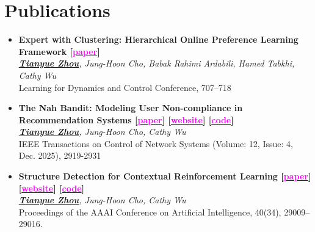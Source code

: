 \documentclass[10pt, letterpaper]{article}
\newenvironment{highlights}{
    \begin{itemize}[
        topsep=0.10 cm,
        parsep=0.10 cm,
        partopsep=0pt,
        itemsep=0pt,
        leftmargin=0 cm + 10pt
    ]
}{
    \end{itemize}
} %
\begin{document}
    \section{Publications}
    \begin{highlights}
        \item \textbf{Expert with Clustering: Hierarchical Online Preference Learning
Framework [\href{https://proceedings.mlr.press/v242/zhou24a/zhou24a.pdf}{\textcolor{magenta}{paper}}]}\\
        \textit{\underline{\textbf{Tianyue Zhou}}, Jung-Hoon Cho, Babak Rahimi Ardabili, Hamed Tabkhi, Cathy Wu}\\
        Learning for Dynamics and Control Conference, 707–718
        
        \item \textbf{The Nah Bandit: Modeling User Non-compliance in
 Recommendation Systems [\href{https://ieeexplore.ieee.org/document/11130914}{\textcolor{magenta}{paper}}] [\href{https://tianyuejo.github.io/The-Nah-Bandit/}{\textcolor{magenta}{website}}] [\href{https://github.com/TianyueJo/The-Nah-Bandit}{\textcolor{magenta}{code}}]}\\
        \textit{\underline{\textbf{Tianyue Zhou}}, Jung-Hoon Cho, Cathy Wu}\\
        IEEE Transactions on Control of Network Systems (Volume: 12, Issue: 4, Dec. 2025), 2919-2931

        \item \textbf{Structure Detection for Contextual Reinforcement
Learning [\href{https://ojs.aaai.org/index.php/AAAI/article/view/40137}{\textcolor{magenta}{paper}}] [\href{https://mit-wu-lab.github.io/SD-MBTL/}{\textcolor{magenta}{website}}] [\href{https://github.com/mit-wu-lab/SD-MBTL}{\textcolor{magenta}{code}}]}\\
        \textit{\underline{\textbf{Tianyue Zhou}}, Jung-Hoon Cho, Cathy Wu}\\
        Proceedings of the AAAI Conference on Artificial Intelligence, 40(34), 29009–29016.

    \end{highlights}
    
\end{document}
